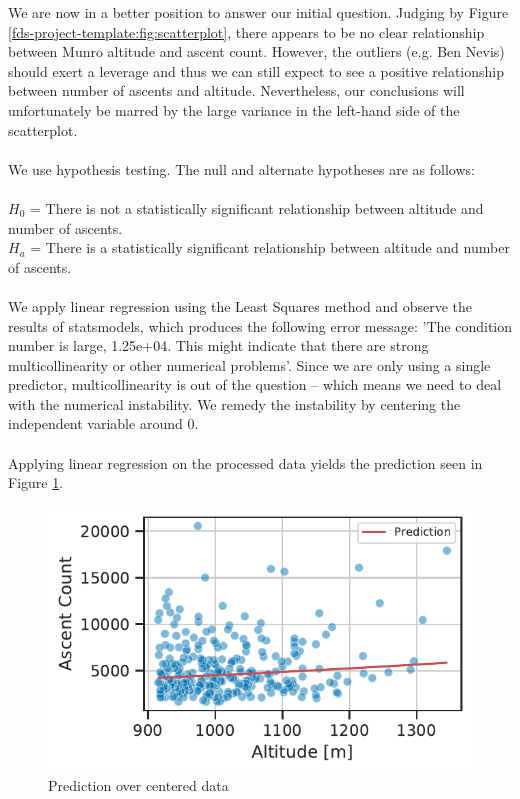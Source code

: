 \documentclass[11pt,a4paper]{article}
\begin{document}
We are now in a better position to answer our initial question. Judging by Figure \ref{fds-project-template:fig:scatterplot}, there appears to be no clear relationship between Munro altitude and ascent count. However, the outliers (e.g. Ben Nevis) should exert a leverage and thus we can still expect to see a positive relationship between number of ascents and altitude. Nevertheless, our conclusions will unfortunately be marred by the large variance in the left-hand side of the scatterplot. \\ \\
We use hypothesis testing. The null and alternate hypotheses are as follows: \\ \\
$H_0$ = There is not a statistically significant relationship between altitude and number of ascents. \\
$H_a$ = There is a statistically significant relationship between altitude and number of ascents. \\ \\
We apply linear regression using the Least Squares method and observe the results of statsmodels, which produces the following error message: 'The condition number is large, 1.25e+04. This might indicate that there are
strong multicollinearity or other numerical problems'. Since we are only using a single predictor, multicollinearity is out of the question – which means we need to deal with the numerical instability. We remedy the instability by centering the independent variable around 0. \\ \\
Applying linear regression on the processed data yields the prediction seen in Figure \ref{fds-project-template:fig:q1_prediction}.
\begin{figure} [h!]
  \centering
  \includegraphics{report/q1_prediction.pdf}
  \caption{Prediction over centered data}
  \label{fds-project-template:fig:q1_prediction}
\end{figure} \\ \\
\end{document}
